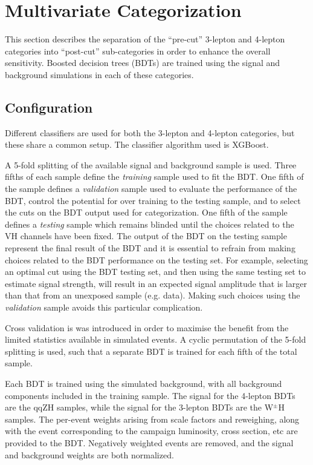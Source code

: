\section{Multivariate Categorization}\label{sec:hmmBdt}

This section describes the separation of the ``pre-cut'' 3-lepton and 4-lepton categories into ``post-cut'' sub-categories in order to enhance the overall sensitivity.
Boosted decision trees (BDTs) are trained using the signal and background simulations in each of these categories.

\subsection{Configuration}
\label{sec:hmmBdtConfiguration}

Different classifiers are used for both the 3-lepton and 4-lepton categories, but these share a common setup.
The classifier algorithm used is XGBoost. \cite{xgboost} 

A 5-fold splitting of the available signal and background sample is used.
 Three fifths of each sample define the \emph{training} sample used to fit the BDT.
 One fifth of the sample defines a \emph{validation} sample used to evaluate the performance of the BDT, control the potential for over training to the testing sample, and to select the cuts on the BDT output used for categorization.
 One fifth of the sample defines a \emph{testing} sample which remains blinded until the choices related to the VH channels have been fixed.
 The output of the BDT on the testing sample represent the final result of the BDT and it is essential to refrain from making choices related to the BDT performance on the testing set.
 For example, selecting an optimal cut using the BDT testing set, and then using the same testing set to estimate signal strength, will result in an expected signal amplitude that is larger than that from an unexposed sample 
(e.g. data).
 Making such choices using the \emph{validation} sample avoids this particular complication.

Cross validation is was introduced in order to maximise the benefit from the limited statistics available in simulated events. A cyclic permutation of the 5-fold splitting is used, such that a separate BDT is trained for each fifth of the total sample.

Each BDT is trained using the simulated background, with all background components included in the training sample.
The signal for the 4-lepton BDTs are the qqZH samples, while the signal for the 3-lepton BDTs are the W$^\pm$H samples. The per-event weights arising from scale factors and reweighing, along with the event corresponding to the campaign luminosity, cross section, etc are provided to the BDT. Negatively weighted events are removed, and the signal and background weights are both normalized.

